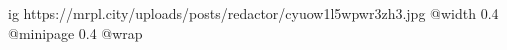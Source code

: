  
 
 
 
 

\ifcmt
  ig https://mrpl.city/uploads/posts/redactor/cyuow1l5wpwr3zh3.jpg
  @width 0.4
  @minipage 0.4
  @wrap \parpic[l]
\fi
